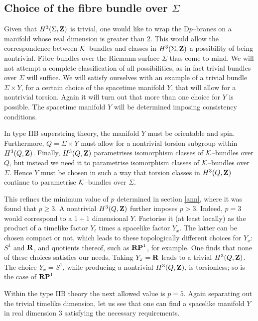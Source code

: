 \documentclass[a4paper,a4paper]{article}
\begin{document}
\subsection{Choice of the fibre bundle over $\Sigma$}\label{manifoldy}

Given that $H^3(\Sigma, {\bf Z})$ is trivial, one would like to wrap the D$p$--branes 
on a manifold whose real dimension is greater than 2. This would allow the
correspondence between ${\cal K}$--bundles and classes in $H^3(\Sigma, {\bf Z})$
a possibility of being nontrivial. Fibre bundles over the Riemann surface $\Sigma$ thus come 
to mind. We will not attempt a complete classification of all 
possibilities, as in fact trivial bundles over $\Sigma$ will suffice.
We will satisfy ourselves with an example of a trivial bundle
$\Sigma\times Y$, for a certain choice of the spacetime manifold $Y$,
that will allow for a nontrivial torsion. Again it will turn out that more 
than one choice for $Y$ is possible. The spacetime manifold $Y$ will be determined 
imposing consistency conditions. 

In type IIB superstring theory, the manifold $Y$ must be orientable
and spin. Furthermore, $Q=\Sigma \times Y$ must allow for a nontrivial 
torsion subgroup within $H^3(Q, {\bf Z})$. Finally, $H^3(Q, {\bf Z})$ 
parametrises isomorphism classes of ${\cal K}$--bundles over $Q$, 
but instead we need it to parametrise isomorphism classes of 
${\cal K}$--bundles over $\Sigma$. Hence $Y$ must be chosen 
in such a way that torsion classes in $H^3(Q, {\bf Z})$ 
continue to parametrise ${\cal K}$--bundles over $\Sigma$.

This refines the minimum value of $p$ determined in section \ref{ann}, 
where it was found that $p\geq 3$. A nontrivial $H^3(Q, {\bf Z})$ further 
imposes $p>3$. Indeed, $p=3$ would correspond to a $1+1$ dimensional $Y$.
Factorise it (at least locally) as the product of a timelike factor $Y_t$ 
times a spacelike factor $Y_x$. The latter can be chosen compact 
or not, which leads to these topologically different choices for $Y_x$: 
$S^1$ and ${\bf R}$, and quotients thereof, such as ${\bf RP}^1$, for 
example. One finds that none of these choices satisfies our needs.
Taking $Y_x={\bf R}$ leads to a trivial $H^3(Q, {\bf Z})$.
The choice $Y_x=S^1$, while producing a nontrivial $H^3(Q, {\bf Z})$, 
is torsionless; so is the case of ${\bf RP}^1$.

Within the type IIB theory the next allowed value is $p=5$. 
Again separating out the trivial timelike dimension, let us see 
that one can find a spacelike manifold $Y$ in real dimension 3
satisfying the necessary requirements.
\end{document}
